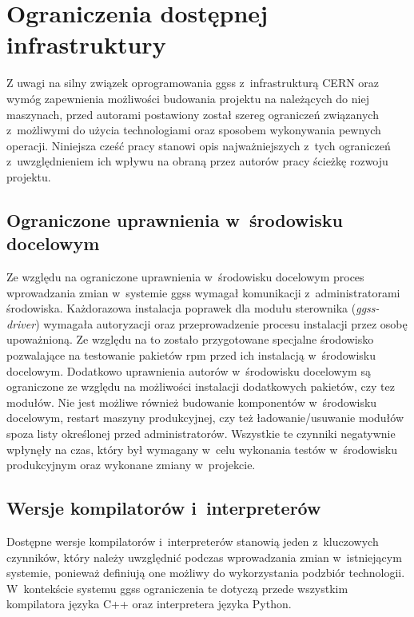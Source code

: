 
\section{Ograniczenia dostępnej infrastruktury}
\label{cha:ogra}
Z uwagi na silny związek oprogramowania \gls*{ggss} z~infrastrukturą CERN oraz wymóg zapewnienia możliwości budowania projektu na należących do niej maszynach, przed autorami postawiony został szereg ograniczeń związanych z~możliwymi do użycia technologiami oraz sposobem wykonywania pewnych operacji. Niniejsza cześć pracy stanowi opis najważniejszych z~tych ograniczeń z~uwzględnieniem ich wpływu na obraną przez autorów pracy ścieżkę rozwoju projektu.


\subsection{Ograniczone uprawnienia w~środowisku docelowym}
Ze względu na ograniczone uprawnienia w~środowisku docelowym proces wprowadzania zmian w~systemie \gls*{ggss} wymagał komunikacji z~administratorami środowiska. Każdorazowa instalacja poprawek dla modułu sterownika (\textit{ggss-driver}) wymagała autoryzacji oraz przeprowadzenie procesu instalacji przez osobę upoważnioną. Ze względu na to zostało przygotowane specjalne środowisko pozwalające na testowanie pakietów \gls*{rpm} przed ich instalacją w~środowisku docelowym. Dodatkowo uprawnienia autorów w~środowisku docelowym są ograniczone ze względu na możliwości instalacji dodatkowych pakietów, czy tez modułów. Nie jest możliwe również budowanie komponentów w~środowisku docelowym, restart maszyny produkcyjnej, czy też ładowanie/usuwanie modułów spoza listy określonej przed administratorów. Wszystkie te czynniki negatywnie wpłynęły na czas, który był wymagany w~celu wykonania testów w~środowisku produkcyjnym oraz wykonane zmiany w~projekcie.


\subsection{Wersje kompilatorów i~interpreterów}
Dostępne wersje kompilatorów i~interpreterów stanowią jeden z~kluczowych czynników, który należy uwzględnić podczas wprowadzania zmian w~istniejącym systemie, ponieważ definiują one możliwy do wykorzystania podzbiór technologii. W~kontekście systemu \gls*{ggss} ograniczenia te dotyczą przede wszystkim kompilatora języka C++ oraz interpretera języka Python. \par

